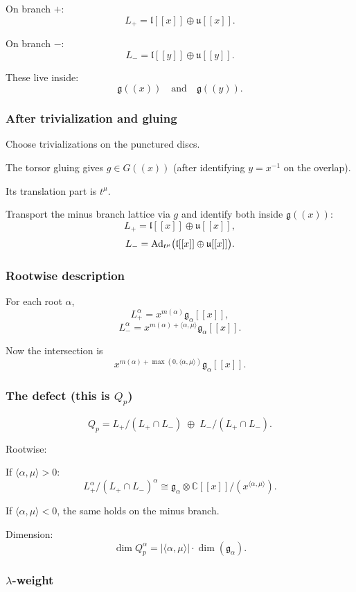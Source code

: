 \documentclass[12pt]{article}
\begin{document}
On branch $+$:
\[
L_+ = \mathfrak{l}[[x]] \oplus \mathfrak{u}[[x]].
\]

On branch $-$:
\[
L_- = \mathfrak{l}[[y]] \oplus \mathfrak{u}[[y]].
\]

These live inside:
\[
\mathfrak{g}((x)) \quad\text{and}\quad \mathfrak{g}((y)).
\]

\subsubsection*{After trivialization and gluing}

Choose trivializations on the punctured discs.

The torsor gluing gives $g \in G((x))$ (after identifying $y = x^{-1}$ on the overlap).

Its translation part is $t^\mu$.

Transport the minus branch lattice via $g$ and identify both inside $\mathfrak{g}((x))$:
\[
L_+ = \mathfrak{l}[[x]] \oplus \mathfrak{u}[[x]],
\]
\[
L_- = \operatorname{Ad}_{t^\mu}\bigl(\mathfrak{l}[[x]] \oplus \mathfrak{u}[[x]]\bigr).
\]

\subsubsection*{Rootwise description}

For each root $\alpha$,
\[
L_+^\alpha = x^{m(\alpha)} \mathfrak{g}_\alpha[[x]],
\]
\[
L_-^\alpha = x^{m(\alpha)+\langle\alpha,\mu\rangle} \mathfrak{g}_\alpha[[x]].
\]

Now the intersection is
\[
x^{m(\alpha)+\max(0,\langle\alpha,\mu\rangle)} \mathfrak{g}_\alpha[[x]].
\]

\subsubsection*{The defect (this is $Q_p$)}

\[
Q_p = L_+/(L_+\cap L_-) \;\oplus\; L_-/(L_+\cap L_-).
\]

Rootwise:

If $\langle\alpha,\mu\rangle>0$:
\[
L_+^\alpha/(L_+\cap L_-)^\alpha \cong \mathfrak{g}_\alpha \otimes \mathbb{C}[[x]]/(x^{\langle\alpha,\mu\rangle}).
\]

If $\langle\alpha,\mu\rangle<0$, the same holds on the minus branch.

Dimension:
\[
\dim Q_p^\alpha = |\langle\alpha,\mu\rangle| \cdot \dim(\mathfrak{g}_\alpha).
\]

\subsubsection*{$\lambda$-weight}
\end{document}
